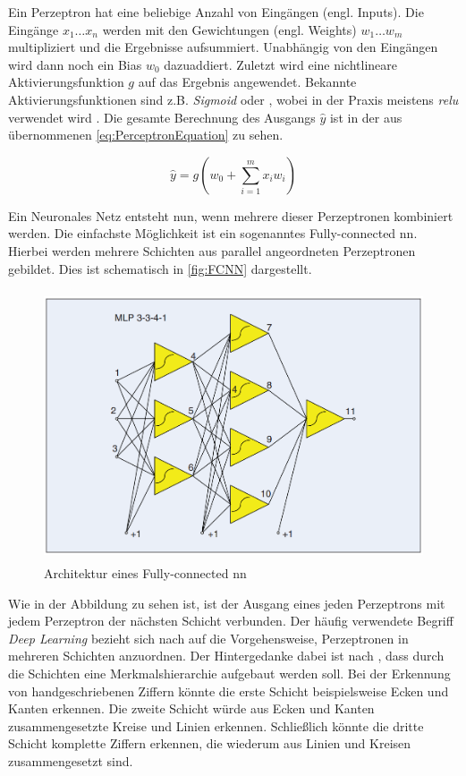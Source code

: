 Ein Perzeptron hat eine beliebige Anzahl von Eingängen (engl. Inputs).
Die Eingänge $x_1 \dots x_n$ werden mit den Gewichtungen (engl. Weights) $w_1 \dots w_m$ multipliziert und die Ergebnisse aufsummiert.
Unabhängig von den Eingängen wird dann noch ein Bias $w_0$ dazuaddiert.
Zuletzt wird eine nichtlineare Aktivierungsfunktion $g$ auf das Ergebnis angewendet.
Bekannte Aktivierungsfunktionen sind z.B. \emph{Sigmoid} oder \emph{}, wobei in der Praxis meistens \emph{\acrshort{relu}} verwendet wird \cite{ActivFuncSharma,ActivFuncNwankpa}.
Die gesamte Berechnung des Ausgangs $\hat{y}$ ist in der aus \cite{6S191Intro} übernommenen \autoref{eq:PerceptronEquation} zu sehen.

\begin{equation}
    \hat{y} = g\left(w_0 + \sum_{i=1}^{m} x_i w_i \right)  
\label{eq:PerceptronEquation}
\end{equation}

Ein Neuronales Netz entsteht nun, wenn mehrere dieser Perzeptronen kombiniert werden.
Die einfachste Möglichkeit ist ein sogenanntes Fully-connected \acrshort{nn}.
Hierbei werden mehrere Schichten aus parallel angeordneten Perzeptronen gebildet.
Dies ist schematisch in \autoref{fig:FCNN} dargestellt.

\begin{figure}[h]
    \centering
    \includegraphics[width=1\textwidth,height=8cm,keepaspectratio=true]{content/images/FCNN.png}
    \caption{Architektur eines Fully-connected \acrshort{nn} \cite[FIGURE 1]{NNArchitectures}}
    \label{fig:FCNN}
\end{figure}

Wie in der Abbildung zu sehen ist, ist der Ausgang eines jeden Perzeptrons mit jedem Perzeptron der nächsten Schicht verbunden.
Der häufig verwendete Begriff \emph{Deep Learning} bezieht sich nach \cite[S. 27]{DeepLearningPythonKeras} auf die Vorgehensweise, Perzeptronen in mehreren Schichten anzuordnen.
Der Hintergedanke dabei ist nach \cite{6S191Intro}, dass durch die Schichten eine Merkmalshierarchie aufgebaut werden soll.
Bei der Erkennung von handgeschriebenen Ziffern könnte die erste Schicht beispielsweise Ecken und Kanten erkennen.
Die zweite Schicht würde aus Ecken und Kanten zusammengesetzte Kreise und Linien erkennen.
Schließlich könnte die dritte Schicht komplette Ziffern erkennen, die wiederum aus Linien und Kreisen zusammengesetzt sind.

